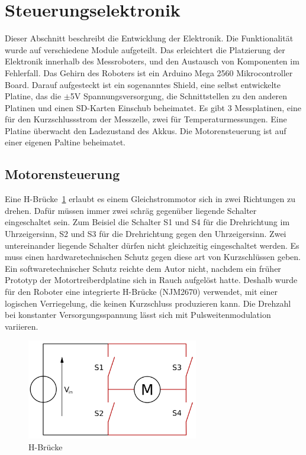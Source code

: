 \documentclass[a4paper,bibtotoc,oneside]{scrbook}
\begin{document}
\section{Steuerungselektronik}\thispagestyle{empty}

Dieser Abschnitt beschreibt die Entwicklung der Elektronik. Die Funktionalität wurde auf verschiedene Module aufgeteilt. Das erleichtert die Platzierung der Elektronik innerhalb des Messroboters, und den Austausch von Komponenten im Fehlerfall. 
Das Gehirn des Roboters ist ein Arduino Mega 2560 Mikrocontroller Board. Darauf aufgesteckt ist ein sogenanntes Shield, eine selbst entwickelte Platine, das die $\pm$5V Spannungsversorgung, die Schnittstellen zu den anderen Platinen und einen SD-Karten Einschub beheimatet.
Es gibt 3 Messplatinen, eine für den Kurzschlussstrom der Messzelle, zwei für Temperaturmessungen. Eine Platine überwacht den Ladezustand des Akkus. Die Motorensteuerung ist auf einer eigenen Paltine beheimatet.
 
\subsection{Motorensteuerung}\thispagestyle{empty}


Eine H-Brücke~\ref{hbridge} erlaubt es einem Gleichstrommotor sich in zwei Richtungen zu drehen. Dafür müssen immer zwei schräg gegenüber liegende Schalter eingeschaltet sein. Zum Beisiel die Schalter S1 und S4 für die Drehrichtung im Uhrzeigersinn, S2 und S3 für die Drehrichtung gegen den Uhrzeigersinn. Zwei untereinander liegende Schalter dürfen nicht gleichzeitig eingeschaltet werden. Es muss einen hardwaretechnischen Schutz gegen diese art von Kurzschlüssen geben. Ein softwaretechnischer Schutz reichte dem Autor nicht, nachdem ein früher Prototyp der Motortreiberdplatine sich in Rauch aufgelöst hatte. Deshalb wurde für den Roboter eine integrierte H-Brücke (NJM2670) verwendet, mit einer logischen Verriegelung, die keinen Kurzschluss produzieren kann. 
\newline
Die Drehzahl bei konstanter Versorgungsspannung lässt sich mit Pulsweitenmodulation variieren.

\begin{figure}[htbp]
\centering
\includegraphics[width=75mm]{img/hbridge.png}
\caption[H-Brücke]{H-Brücke}\label{hbridge}
\end{figure}
\end{document}
